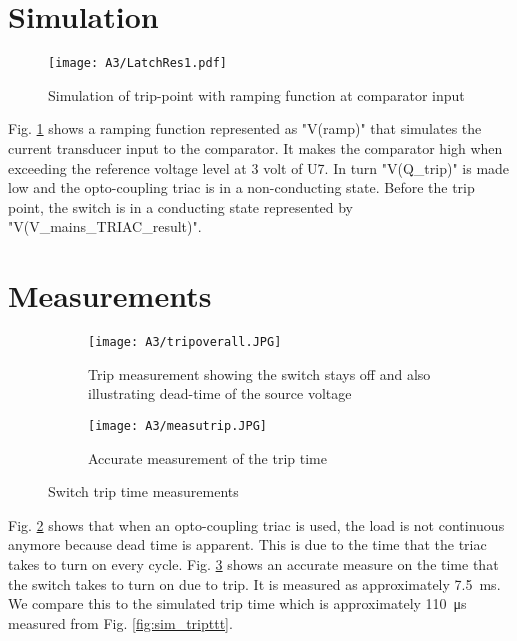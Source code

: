 \section{Simulation} \label{sec:sw_simu} 

\begin{figure}[H]
    \centering
    \texttt{[image: A3/LatchRes1.pdf]}
    \caption{Simulation of trip-point with ramping function at comparator input}
    \label{fig:Latch_OC_Res}
\end{figure}

Fig. \ref{fig:Latch_OC_Res} shows a ramping function represented as "V(ramp)" that simulates the current transducer input to the comparator. It makes the comparator high when exceeding the reference voltage level at 3 volt of U7. In turn "V(Q\_trip)" is made low and the opto-coupling triac is in a non-conducting state. Before the trip point, the switch is in a conducting state represented by "V(V\_mains\_TRIAC\_result)".

\section{Measurements} \label{sec:sw_meas}

\begin{figure}[H]
\centering
\begin{subfigure}{.5\textwidth}
     \centering
    \texttt{[image: A3/tripoverall.JPG]}
    \caption{Trip measurement showing the switch stays off and also illustrating dead-time of the source voltage}
    \label{subfig:trip1}
\end{subfigure}%
\begin{subfigure}{.5\textwidth}
     \centering
    \texttt{[image: A3/measutrip.JPG]}
    \caption{Accurate measurement of the trip time}
    \label{subfig:trip_accurate}
\end{subfigure}
\label{trip measurements}
\caption{Switch trip time measurements}
\end{figure}

Fig. \ref{subfig:trip1} shows that when an opto-coupling triac is used, the load is not continuous anymore because dead time is apparent. This is due to the time that the triac takes to turn on every cycle.
Fig. \ref{subfig:trip_accurate} shows an accurate measure on the time that the switch takes to turn on due to trip. It is measured as approximately \SI{7.5}{\milli s}. We compare this to the simulated trip time which is approximately \SI{110}{\micro s} measured from Fig. \ref{fig:sim_tripttt}. 


